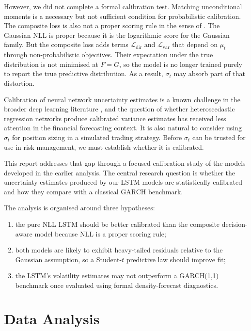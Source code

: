 \documentclass[%
 amsmath,amssymb,
 aps,
 pra,
 floatfix,
 raggedbottom,
 nofootinbib,
12pt,]{revtex4-2}
\begin{document}
However, we did not complete a formal calibration test. Matching unconditional moments is a necessary but not sufficient condition for probabilistic calibration. The composite loss is also not a proper scoring rule in the sense of \citet{gneiting2007strictly}. The Gaussian NLL is proper because it is the logarithmic score for the Gaussian family. But the composite loss adds terms $\mathcal{L}_{\text{dir}}$ and $\mathcal{L}_{\text{var}}$ that depend on $\mu_t$ through non-probabilistic objectives. Their expectation under the true distribution is not minimised at $F = G$, so the model is no longer trained purely to report the true predictive distribution. As a result, $\sigma_t$ may absorb part of that distortion.

Calibration of neural network uncertainty estimates is a known challenge in the broader deep learning literature \citep{kuleshov2018accurate}, and the question of whether heteroscedastic regression networks produce calibrated variance estimates has received less attention in the financial forecasting context. It is also natural to consider using $\sigma_t$ for position sizing in a simulated trading strategy. Before $\sigma_t$ can be trusted for use in risk management, we must establish whether it is calibrated.

This report addresses that gap through a focused calibration study of the models developed in the earlier analysis. The central research question is whether the uncertainty estimates produced by our LSTM models are statistically calibrated and how they compare with a classical GARCH benchmark.

The analysis is organised around three hypotheses:
\begin{enumerate}
    \item the pure NLL LSTM should be better calibrated than the composite decision-aware model because NLL is a proper scoring rule;
    \item both models are likely to exhibit heavy-tailed residuals relative to the Gaussian assumption, so a Student-$t$ predictive law should improve fit;
    \item the LSTM's volatility estimates may not outperform a GARCH(1,1) benchmark once evaluated using formal density-forecast diagnostics.
\end{enumerate}
\section{Data Analysis}
\label{sec:data}
\end{document}
